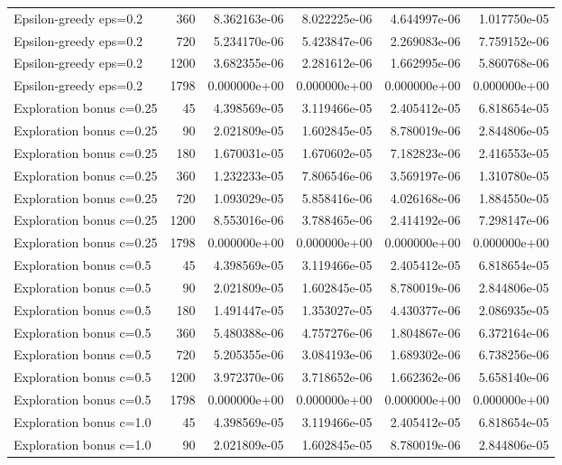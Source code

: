 \begin{scriptsize}
\begin{longtable}{lrrrrr}
Epsilon-greedy eps=0.2 & 360 & 8.362163e-06 & 8.022225e-06 & 4.644997e-06 & 1.017750e-05 \\
Epsilon-greedy eps=0.2 & 720 & 5.234170e-06 & 5.423847e-06 & 2.269083e-06 & 7.759152e-06 \\
Epsilon-greedy eps=0.2 & 1200 & 3.682355e-06 & 2.281612e-06 & 1.662995e-06 & 5.860768e-06 \\
Epsilon-greedy eps=0.2 & 1798 & 0.000000e+00 & 0.000000e+00 & 0.000000e+00 & 0.000000e+00 \\
Exploration bonus c=0.25 & 45 & 4.398569e-05 & 3.119466e-05 & 2.405412e-05 & 6.818654e-05 \\
Exploration bonus c=0.25 & 90 & 2.021809e-05 & 1.602845e-05 & 8.780019e-06 & 2.844806e-05 \\
Exploration bonus c=0.25 & 180 & 1.670031e-05 & 1.670602e-05 & 7.182823e-06 & 2.416553e-05 \\
Exploration bonus c=0.25 & 360 & 1.232233e-05 & 7.806546e-06 & 3.569197e-06 & 1.310780e-05 \\
Exploration bonus c=0.25 & 720 & 1.093029e-05 & 5.858416e-06 & 4.026168e-06 & 1.884550e-05 \\
Exploration bonus c=0.25 & 1200 & 8.553016e-06 & 3.788465e-06 & 2.414192e-06 & 7.298147e-06 \\
Exploration bonus c=0.25 & 1798 & 0.000000e+00 & 0.000000e+00 & 0.000000e+00 & 0.000000e+00 \\
Exploration bonus c=0.5 & 45 & 4.398569e-05 & 3.119466e-05 & 2.405412e-05 & 6.818654e-05 \\
Exploration bonus c=0.5 & 90 & 2.021809e-05 & 1.602845e-05 & 8.780019e-06 & 2.844806e-05 \\
Exploration bonus c=0.5 & 180 & 1.491447e-05 & 1.353027e-05 & 4.430377e-06 & 2.086935e-05 \\
Exploration bonus c=0.5 & 360 & 5.480388e-06 & 4.757276e-06 & 1.804867e-06 & 6.372164e-06 \\
Exploration bonus c=0.5 & 720 & 5.205355e-06 & 3.084193e-06 & 1.689302e-06 & 6.738256e-06 \\
Exploration bonus c=0.5 & 1200 & 3.972370e-06 & 3.718652e-06 & 1.662362e-06 & 5.658140e-06 \\
Exploration bonus c=0.5 & 1798 & 0.000000e+00 & 0.000000e+00 & 0.000000e+00 & 0.000000e+00 \\
Exploration bonus c=1.0 & 45 & 4.398569e-05 & 3.119466e-05 & 2.405412e-05 & 6.818654e-05 \\
Exploration bonus c=1.0 & 90 & 2.021809e-05 & 1.602845e-05 & 8.780019e-06 & 2.844806e-05 \\

\end{longtable}
\end{scriptsize}
